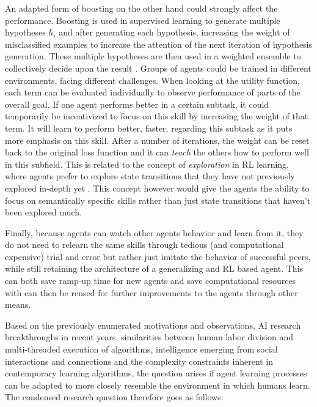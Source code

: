 \documentclass[12pt,a4paper]{article}
\begin{document}
An adapted form of boosting on the other hand could strongly affect the performance. Boosting is used in supervised
learning to generate multiple hypotheses $h_i$ and after generating each hypothesis, increasing the weight of
misclassified examples to increase the attention of the next iteration of hypothesis generation. These multiple
hypotheses are then used in a weighted ensemble to collectively decide upon the result \cite[p.749
ff.]{russell2016artificial}. Groups of agents could be trained in different environments, facing different challenges.
When looking at the utility function, each term can be evaluated individually to observe performance of parts of the
overall goal. If one agent performs better in a certain subtask, it could temporarily be incentivized to focus on this
skill by increasing the weight of that term. It will learn to perform better, faster, regarding this subtask as it puts
more emphasis on this skill. After a number of iterations, the weight can be reset back to the original loss function
and it can \emph{teach} the others how to perform well in this subfield. This is related to the concept of
\emph{exploration} in \ac{RL} learning, where agents prefer to explore state transitions that they have not previously
explored in-depth yet \cite[p.839f.]{russell2016artificial}. This concept however would give the agents the ability to
focus on semantically specific skills rather than just state transitions that haven't been explored much.

Finally, because agents can watch other agents behavior and learn from it, they do not need to relearn the same skills
through tedious (and computational expensive) trial and error but rather just imitate the behavior of successful peers,
while still retaining the architecture of a generalizing and \ac{RL} based agent. This can both save ramp-up time for
new agents and save computational resources with can then be reused for further improvements to the agents through other
means.

Based on the previously enumerated motivations and observations, AI research breakthroughs in recent years, similarities
between human labor division and multi-threaded execution of algorithms, intelligence emerging from social interactions
and connections and the complexity constraints inherent in contemporary learning algorithms, the question arises if
agent learning processes can be adapted to more closely resemble the environment in which humans learn. The condensed
research question therefore goes as follows:
\end{document}
